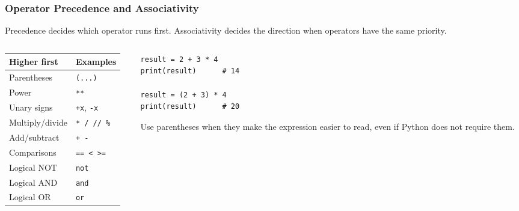 \documentclass[aspectratio=169,10pt]{beamer}
\begin{document}
\begin{frame}[fragile]
\frametitle{Operator Precedence and Associativity}
\begin{tcolorbox}[lecturebox,title=Key idea]
Precedence decides which operator runs first. Associativity decides the direction when operators have the same priority.
\end{tcolorbox}

\begin{columns}[T,totalwidth=\textwidth]
\begin{column}{0.49\textwidth}
\small
\begin{adjustbox}{max width=\textwidth,max totalheight=0.54\textheight}
\begin{tabular}{@{}p{3.0cm}p{3.0cm}@{}}
\toprule
\textbf{Higher first} & \textbf{Examples} \\
\midrule
Parentheses & \texttt{(...)} \\
Power & \texttt{**} \\
Unary signs & \texttt{+x}, \texttt{-x} \\
Multiply/divide & \texttt{* / // \%} \\
Add/subtract & \texttt{+ -} \\
Comparisons & \texttt{== < >=} \\
Logical NOT & \texttt{not} \\
Logical AND & \texttt{and} \\
Logical OR & \texttt{or} \\
\bottomrule
\end{tabular}
\end{adjustbox}
\end{column}
\begin{column}{0.48\textwidth}
\begin{lstlisting}[style=pycodesmall]
result = 2 + 3 * 4
print(result)      # 14

result = (2 + 3) * 4
print(result)      # 20
\end{lstlisting}

\begin{tcolorbox}[lecturebox,title=Best habit]
Use parentheses when they make the expression easier to read, even if Python does not require them.
\end{tcolorbox}
\end{column}
\end{columns}
\end{frame}
\end{document}

